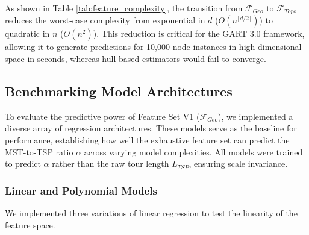\documentclass{article}
\begin{document}
As shown in Table \ref{tab:feature_complexity}, the transition from $\mathcal{F}_{Geo}$ to $\mathcal{F}_{Topo}$ reduces the worst-case complexity from exponential in $d$ ($O(n^{\lfloor d/2 \rfloor})$) to quadratic in $n$ ($O(n^2)$). This reduction is critical for the GART 3.0 framework, allowing it to generate predictions for 10,000-node instances in high-dimensional space in seconds, whereas hull-based estimators would fail to converge.

\subsection{Benchmarking Model Architectures}
\label{subsec:benchmarking_models}

To evaluate the predictive power of Feature Set V1 ($\mathcal{F}_{Geo}$), we implemented a diverse array of regression architectures. These models serve as the baseline for performance, establishing how well the exhaustive feature set can predict the MST-to-TSP ratio $\alpha$ across varying model complexities. All models were trained to predict $\alpha$ rather than the raw tour length $L_{TSP}$, ensuring scale invariance.

\subsubsection{Linear and Polynomial Models}
We implemented three variations of linear regression to test the linearity of the feature space.
\end{document}
